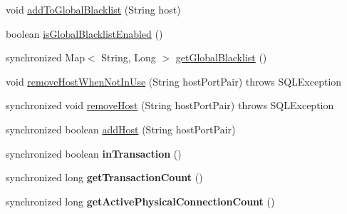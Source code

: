 \begin{DoxyCompactItemize}
\item 
void \mbox{\hyperlink{classcom_1_1mysql_1_1cj_1_1jdbc_1_1ha_1_1_load_balanced_connection_proxy_a27a3da948290bb7ce8ee8e5bac850443}{add\+To\+Global\+Blacklist}} (String host)
\item 
boolean \mbox{\hyperlink{classcom_1_1mysql_1_1cj_1_1jdbc_1_1ha_1_1_load_balanced_connection_proxy_a2051b9a1b9ffc14c9aa4190a61eb5b15}{is\+Global\+Blacklist\+Enabled}} ()
\item 
synchronized Map$<$ String, Long $>$ \mbox{\hyperlink{classcom_1_1mysql_1_1cj_1_1jdbc_1_1ha_1_1_load_balanced_connection_proxy_a166490bbe3865b511ff7df42813a97d8}{get\+Global\+Blacklist}} ()
\item 
void \mbox{\hyperlink{classcom_1_1mysql_1_1cj_1_1jdbc_1_1ha_1_1_load_balanced_connection_proxy_a979d78c2f78920bb885e9eb73c4b37d0}{remove\+Host\+When\+Not\+In\+Use}} (String host\+Port\+Pair)  throws S\+Q\+L\+Exception 
\item 
synchronized void \mbox{\hyperlink{classcom_1_1mysql_1_1cj_1_1jdbc_1_1ha_1_1_load_balanced_connection_proxy_a77e171c52a2cc37e2b2d0f854bf4d050}{remove\+Host}} (String host\+Port\+Pair)  throws S\+Q\+L\+Exception 
\item 
synchronized boolean \mbox{\hyperlink{classcom_1_1mysql_1_1cj_1_1jdbc_1_1ha_1_1_load_balanced_connection_proxy_a02279adacc22183bb7e8c8a4d6e61d5a}{add\+Host}} (String host\+Port\+Pair)
\item 
\mbox{\label{classcom_1_1mysql_1_1cj_1_1jdbc_1_1ha_1_1_load_balanced_connection_proxy_aa3b950fc8a61d19e82b3b29660a0f36d}} 
synchronized boolean {\bfseries in\+Transaction} ()
\item 
\mbox{\label{classcom_1_1mysql_1_1cj_1_1jdbc_1_1ha_1_1_load_balanced_connection_proxy_a529a4a6245e7baac3eb2eb8688597328}} 
synchronized long {\bfseries get\+Transaction\+Count} ()
\item 
\mbox{\label{classcom_1_1mysql_1_1cj_1_1jdbc_1_1ha_1_1_load_balanced_connection_proxy_a12463c009b1bc22d617d2bfa6c531430}} 
synchronized long {\bfseries get\+Active\+Physical\+Connection\+Count} ()
\item 
\mbox{\label{classcom_1_1mysql_1_1cj_1_1jdbc_1_1ha_1_1_load_balanced_connection_proxy_aa02df5b0f92d38804979c7ca65e9ecf0}} 

\end{DoxyCompactItemize}
